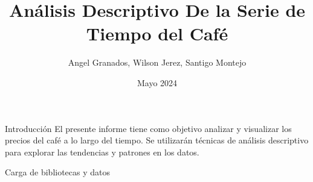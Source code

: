 \documentclass[
  10pt,
  ignorenonframetext,
  aspectratio=1612]{beamer}
\title{Análisis Descriptivo De la Serie de Tiempo del Café}
\author{Angel Granados, Wilson Jerez, Santigo Montejo}
\date{Mayo 2024}
\newenvironment{Shaded}{\begin{snugshade}}{\end{snugshade}}
\newcommand{\CommentTok}[1]{\textcolor[rgb]{0.56,0.35,0.01}{\textit{#1}}}
\newcommand{\FunctionTok}[1]{\textcolor[rgb]{0.13,0.29,0.53}{\textbf{#1}}}
\newcommand{\NormalTok}[1]{#1}
\newcommand{\OtherTok}[1]{\textcolor[rgb]{0.56,0.35,0.01}{#1}}
\newcommand{\SpecialCharTok}[1]{\textcolor[rgb]{0.81,0.36,0.00}{\textbf{#1}}}
\newcommand{\StringTok}[1]{\textcolor[rgb]{0.31,0.60,0.02}{#1}}
\begin{document}
\frame{\titlepage}

\begin{frame}{Introducción}
\label{introducciuxf3n}
El presente informe tiene como objetivo analizar y visualizar los
precios del café a lo largo del tiempo. Se utilizarán técnicas de
análisis descriptivo para explorar las tendencias y patrones en los
datos.
\end{frame}

\begin{frame}[fragile]{Carga de bibliotecas y datos}
\label{carga-de-bibliotecas-y-datos}
\begin{Shaded}
\end{Shaded}
\end{frame}
\end{document}
